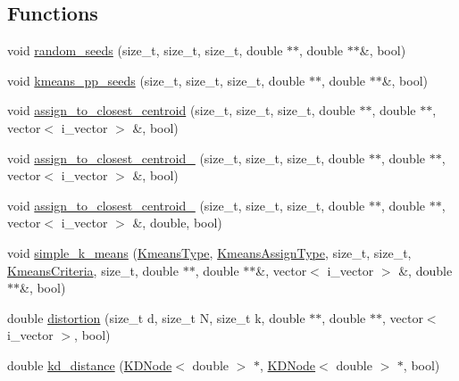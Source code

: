 \subsection*{Functions}
\begin{DoxyCompactItemize}
\item 
void \hyperlink{namespaceSimpleCluster_aa3c1fa27364305d35f14eb0b6b984a10}{random\+\_\+seeds} (size\+\_\+t, size\+\_\+t, size\+\_\+t, double $\ast$$\ast$, double $\ast$$\ast$\&, bool)
\item 
void \hyperlink{namespaceSimpleCluster_ab1abfee692e0476f34c72ac18a68bf17}{kmeans\+\_\+pp\+\_\+seeds} (size\+\_\+t, size\+\_\+t, size\+\_\+t, double $\ast$$\ast$, double $\ast$$\ast$\&, bool)
\item 
void \hyperlink{namespaceSimpleCluster_aca74ac04af2feab94c72dcfe7a26fd9f}{assign\+\_\+to\+\_\+closest\+\_\+centroid} (size\+\_\+t, size\+\_\+t, size\+\_\+t, double $\ast$$\ast$, double $\ast$$\ast$, vector$<$ i\+\_\+vector $>$ \&, bool)
\item 
void \hyperlink{namespaceSimpleCluster_af66bb5dcaeacf5d9a3856fbf793115d5}{assign\+\_\+to\+\_\+closest\+\_\+centroid\+\_} (size\+\_\+t, size\+\_\+t, size\+\_\+t, double $\ast$$\ast$, double $\ast$$\ast$, vector$<$ i\+\_\+vector $>$ \&, bool)
\item 
void \hyperlink{namespaceSimpleCluster_ae3eb269fbf66080b629b367254abe6b7}{assign\+\_\+to\+\_\+closest\+\_\+centroid\+\_} (size\+\_\+t, size\+\_\+t, size\+\_\+t, double $\ast$$\ast$, double $\ast$$\ast$, vector$<$ i\+\_\+vector $>$ \&, double, bool)
\item 
void \hyperlink{namespaceSimpleCluster_a7bc3ccce11e60fd93ee92a1c4095c337}{simple\+\_\+k\+\_\+means} (\hyperlink{namespaceSimpleCluster_a8a8f57121b69a7b43575e4d6a53928e2}{Kmeans\+Type}, \hyperlink{namespaceSimpleCluster_a1ad2d6129171ff9a5ee57f48b5f3f6e1}{Kmeans\+Assign\+Type}, size\+\_\+t, size\+\_\+t, \hyperlink{structSimpleCluster_1_1KmeansCriteria}{Kmeans\+Criteria}, size\+\_\+t, double $\ast$$\ast$, double $\ast$$\ast$\&, vector$<$ i\+\_\+vector $>$ \&, double $\ast$$\ast$\&, bool)
\item 
double \hyperlink{namespaceSimpleCluster_a2b5ed423662d1968e1af5262812d7ca8}{distortion} (size\+\_\+t d, size\+\_\+t N, size\+\_\+t k, double $\ast$$\ast$, double $\ast$$\ast$, vector$<$ i\+\_\+vector $>$, bool)
\item 
double \hyperlink{namespaceSimpleCluster_ab268f110e34b3762c1de5b7fe4eda10c}{kd\+\_\+distance} (\hyperlink{classSimpleCluster_1_1KDNode}{K\+D\+Node}$<$ double $>$ $\ast$, \hyperlink{classSimpleCluster_1_1KDNode}{K\+D\+Node}$<$ double $>$ $\ast$, bool)
$$
\end{DoxyCompactItemize}
